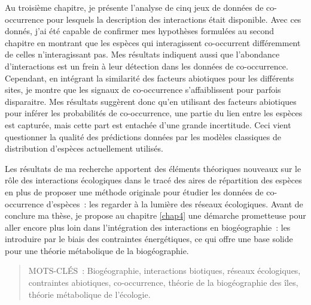 Au troisième chapitre, je présente l'analyse de cinq jeux de données de
co-occurrence pour lesquels la description des interactions était
disponible. Avec ces donnés, j'ai été capable de confirmer mes
hypothèses formulées au second chapitre en montrant que les espèces qui
interagissent co-occurrent différemment de celles n'interagissant pas.
Mes résultats indiquent aussi que l'abondance d'interactions est un
frein à leur détection dans les données de co-occurrence. Cependant, en
intégrant la similarité des facteurs abiotiques pour les différents
sites, je montre que les signaux de co-occurrence s'affaiblissent pour
parfois disparaitre. Mes résultats suggèrent donc qu'en utilisant des
facteurs abiotiques pour inférer les probabilités de co-occurrence, une
partie du lien entre les espèces est capturée, mais cette part est
entachée d'une grande incertitude. Ceci vient questionner la qualité des
prédictions données par les modèles classiques de distribution d'espèces
actuellement utilisés.

Les résultats de ma recherche apportent des éléments théoriques nouveaux
sur le rôle des interactions écologiques dans le tracé des aires de
répartition des espèces en plus de proposer une méthode originale pour
étudier les données de co-occurrence d'espèces~: les regarder à la
lumière des réseaux écologiques. Avant de conclure ma thèse, je propose
au chapitre \ref{chap4} une démarche prometteuse pour aller encore plus
loin dans l'intégration des interactions en biogéographie~: les
introduire par le biais des contraintes énergétiques, ce qui offre une
base solide pour une théorie métabolique de la biogéographie.

\begin{quote}
MOTS-CLÉS~: Biogéographie, interactions biotiques, réseaux écologiques,
contraintes abiotiques, co-occurrence, théorie de la biogéographie des
îles, théorie métabolique de l'écologie.
\end{quote}

